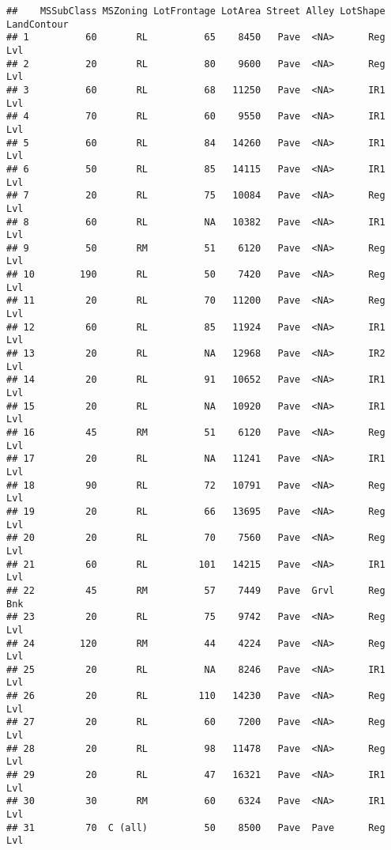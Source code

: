 \documentclass[
]{article}
\begin{document}
\begin{verbatim}
##    MSSubClass MSZoning LotFrontage LotArea Street Alley LotShape LandContour
## 1          60       RL          65    8450   Pave  <NA>      Reg         Lvl
## 2          20       RL          80    9600   Pave  <NA>      Reg         Lvl
## 3          60       RL          68   11250   Pave  <NA>      IR1         Lvl
## 4          70       RL          60    9550   Pave  <NA>      IR1         Lvl
## 5          60       RL          84   14260   Pave  <NA>      IR1         Lvl
## 6          50       RL          85   14115   Pave  <NA>      IR1         Lvl
## 7          20       RL          75   10084   Pave  <NA>      Reg         Lvl
## 8          60       RL          NA   10382   Pave  <NA>      IR1         Lvl
## 9          50       RM          51    6120   Pave  <NA>      Reg         Lvl
## 10        190       RL          50    7420   Pave  <NA>      Reg         Lvl
## 11         20       RL          70   11200   Pave  <NA>      Reg         Lvl
## 12         60       RL          85   11924   Pave  <NA>      IR1         Lvl
## 13         20       RL          NA   12968   Pave  <NA>      IR2         Lvl
## 14         20       RL          91   10652   Pave  <NA>      IR1         Lvl
## 15         20       RL          NA   10920   Pave  <NA>      IR1         Lvl
## 16         45       RM          51    6120   Pave  <NA>      Reg         Lvl
## 17         20       RL          NA   11241   Pave  <NA>      IR1         Lvl
## 18         90       RL          72   10791   Pave  <NA>      Reg         Lvl
## 19         20       RL          66   13695   Pave  <NA>      Reg         Lvl
## 20         20       RL          70    7560   Pave  <NA>      Reg         Lvl
## 21         60       RL         101   14215   Pave  <NA>      IR1         Lvl
## 22         45       RM          57    7449   Pave  Grvl      Reg         Bnk
## 23         20       RL          75    9742   Pave  <NA>      Reg         Lvl
## 24        120       RM          44    4224   Pave  <NA>      Reg         Lvl
## 25         20       RL          NA    8246   Pave  <NA>      IR1         Lvl
## 26         20       RL         110   14230   Pave  <NA>      Reg         Lvl
## 27         20       RL          60    7200   Pave  <NA>      Reg         Lvl
## 28         20       RL          98   11478   Pave  <NA>      Reg         Lvl
## 29         20       RL          47   16321   Pave  <NA>      IR1         Lvl
## 30         30       RM          60    6324   Pave  <NA>      IR1         Lvl
## 31         70  C (all)          50    8500   Pave  Pave      Reg         Lvl

\end{verbatim}
\end{document}
